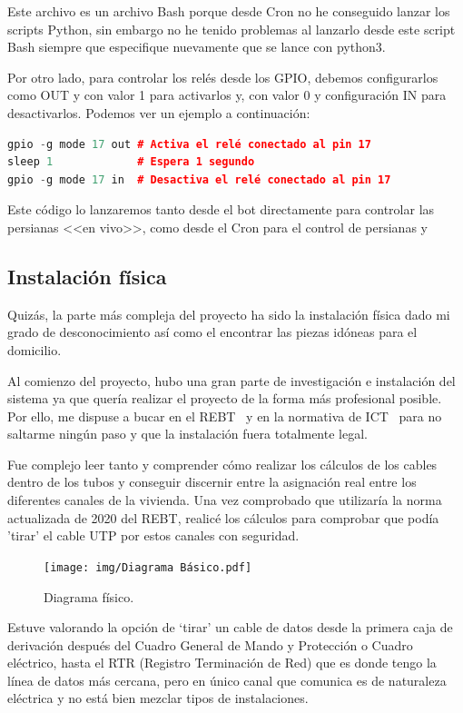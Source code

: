 Este archivo es un archivo Bash porque desde Cron no he conseguido lanzar los scripts Python, sin embargo no he tenido problemas al lanzarlo desde este script Bash siempre que especifique nuevamente que se lance con python3.

Por otro lado, para controlar los relés desde los GPIO, debemos configurarlos como OUT y con valor 1 para activarlos y, con valor 0 y configuración IN para desactivarlos. Podemos ver un ejemplo a continuación:
\begin{lstlisting}[language=cpp, caption={Ejemplo activación y desactivación de relé.}]
gpio -g mode 17 out # Activa el relé conectado al pin 17
sleep 1             # Espera 1 segundo
gpio -g mode 17 in  # Desactiva el relé conectado al pin 17
\end{lstlisting}

Este código lo lanzaremos tanto desde el bot directamente para controlar las persianas <<en vivo>>, como desde el Cron para el control de persianas y 

\subsection{Instalación física}

Quizás, la parte más compleja del proyecto ha sido la instalación física dado mi grado de desconocimiento así como el encontrar las piezas idóneas para el domicilio.

Al comienzo del proyecto, hubo una gran parte de investigación e instalación del sistema ya que quería realizar el proyecto de la forma más profesional posible. Por ello, me dispuse a bucar en el REBT~\cite{manual:REBT} y en la normativa de ICT~\cite{manual:ICT-BT-21} para no saltarme ningún paso y que la instalación fuera totalmente legal.

Fue complejo leer tanto y comprender cómo realizar los cálculos de los cables dentro de los tubos y conseguir discernir entre la asignación real entre los diferentes canales de la vivienda. Una vez comprobado que utilizaría la norma actualizada de 2020 del REBT, realicé los cálculos para comprobar que podía 'tirar' el cable UTP por estos canales con seguridad. 

\begin{figure}
    \centering
    \texttt{[image: img/Diagrama Básico.pdf]}
    \caption{Diagrama físico. } \label{Img:diagramaBasico}
\end{figure}

Estuve valorando la opción de ‘tirar’ un cable de datos desde la primera caja de derivación después del Cuadro General de Mando y Protección o Cuadro eléctrico, hasta el RTR (Registro Terminación de Red) que es donde tengo la línea de datos más cercana, pero en único canal que comunica es de naturaleza eléctrica y no está bien mezclar tipos de instalaciones.

